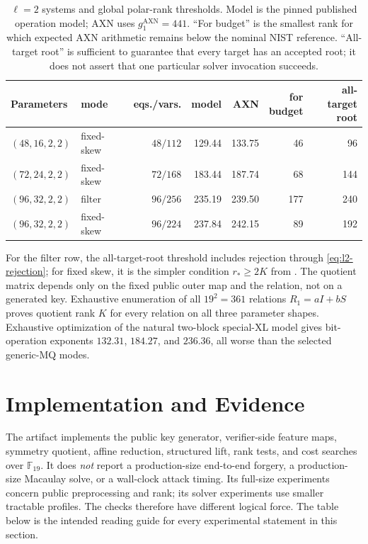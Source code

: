 \documentclass[11pt]{article}
\newcommand{\F}{\mathbb F}
\begin{document}
\begin{table}[tbp]
\centering
\caption{$\ell=2$ systems and global polar-rank thresholds.  Model is the
pinned published operation model; AXN uses $g_1^{\mathrm{AXN}}=441$.  ``For
budget'' is the smallest rank for which expected AXN arithmetic remains below
the nominal NIST reference.  ``All-target root'' is sufficient to guarantee
that every target has an accepted root; it does not assert that one particular
solver invocation succeeds.}
\label{tab:l2-costs}
\scriptsize
\setlength{\tabcolsep}{3.25pt}
\begin{tabular}{@{}l l r r r r r@{}}
\toprule
Parameters & mode & eqs./vars. & model & AXN & \shortstack{for\\budget} & \shortstack{all-target\\root}\\
\midrule
$(48,16,2,2)$ & fixed-skew & $48/112$ & 129.44 & 133.75 & 46  & 96\\
$(72,24,2,2)$ & fixed-skew & $72/168$ & 183.44 & 187.74 & 68  & 144\\
$(96,32,2,2)$ & filter     & $96/256$ & 235.19 & 239.50 & 177 & 240\\
$(96,32,2,2)$ & fixed-skew & $96/224$ & 237.84 & 242.15 & 89  & 192\\
\bottomrule
\end{tabular}
\end{table}

For the filter row, the all-target-root threshold includes rejection through
\eqref{eq:l2-rejection}; for fixed skew, it is the simpler condition
$r_*\ge2K$ from .  The quotient matrix depends only on the
fixed public outer map and the relation, not on a generated key.  Exhaustive
enumeration of all $19^2=361$ relations $R_1=aI+bS$ proves quotient rank $K$
for every relation on all three parameter shapes.  Exhaustive optimization of
the natural two-block special-XL model gives bit-operation exponents $132.31$,
$184.27$, and $236.36$, all worse than the selected generic-MQ modes.

\section{Implementation and Evidence}\label{sec:evidence}

The artifact implements the public key generator, verifier-side feature maps,
symmetry quotient, affine reduction, structured lift, rank tests, and cost
searches over $\F_{19}$.  It does \emph{not} report a production-size
end-to-end forgery, a production-size Macaulay solve, or a wall-clock attack
timing.  Its full-size experiments concern public preprocessing and rank; its
solver experiments use smaller tractable profiles.  The checks therefore have
different logical force.  The table
below is the intended reading guide for every experimental statement in this
section.
\end{document}
